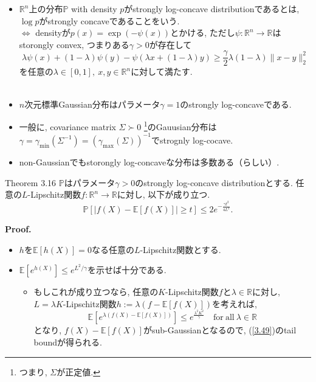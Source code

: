 \documentclass[aspectratio=169, dvipdfmx]{beamer}
\newcommand{\ex}{\mathbb{E}}
\begin{document}
\begin{frame}
\begin{itemize}
    \item $\mathbb{R}^n$上の分布$\mathbb{P}$ with density $p$が{strongly log-concave distribution}であるとは,
    $\log p$がstrongly concaveであることをいう.\\
    $\Leftrightarrow$ densityが$p(x) = \exp(-\psi(x))$とかける,
    ただし$\psi:\mathbb{R}^n\to\mathbb{R}$はstorongly convex, つまりある$\gamma > 0$が存在して
    \[
        \lambda \psi(x)+(1-\lambda) \psi(y)-\psi(\lambda x+(1-\lambda) y)
        \geq \frac{\gamma}{2} \lambda(1-\lambda)\|x-y\|_{2}^{2}
        \tag{3.48}\label{3.48}
    \]
    を任意の$\lambda \in[0,1],\ x,y\in\mathbb{R}^n$に対して満たす.\\
    　
    \item $n$次元標準Gaussian分布はパラメータ$\gamma=1$のstrongly log-concaveである.
    \item 一般に, covariance matrix $\Sigma\succ 0$
    \footnote{つまり, $\Sigma$が正定値.}のGauusian分布は$\gamma = \gamma_{\min}(\Sigma^{-1})=(\gamma_{\max}(\Sigma))^{-1}$でstrognly log-cocave.
    \item non-Gaussianでもstorongly log-concaveな分布は多数ある（らしい）.
\end{itemize}
\end{frame}

\begin{frame}
\begin{block}{Theorem 3.16}
    $\mathbb{P}$はパラメータ$\gamma>0$のstrongly log-concave distributionとする.
    任意の$L$-Lipschitz関数$f:\mathbb{R}^n\to\mathbb{R}$に対し, 以下が成り立つ.
    \[
        \mathbb{P}[|f(X)-\mathbb{E}[f(X)]|
        \geq t] \leq 2 e^{-\frac{\gamma t^{2}}{4 L^{2}}}.
        \tag{3.49}\label{3.49}
    \]
\end{block}
{\bf Proof.}
\begin{itemize}
    \item $h$を$\ex[h(X)]=0$なる任意の$L$-Lipschitz関数とする.
    \item $\ex[e^{h(X)}]\le e^{L^2/\gamma}$を示せば十分である.
    \begin{itemize}
        \item もしこれが成り立つなら, 任意の$K$-Lipschitz関数$f$と$\lambda\in\mathbb{R}$に対し,
        $L=\lambda K$-Lipschitz関数$h:= \lambda(f - \ex[f(X)])$を考えれば,
        \[ \ex[e^{\lambda(f(X)-\ex[f(X)])}] \le e^{\frac{\lambda^2 K^2}{\gamma}}\quad\mathrm{for\ all}\ \lambda\in\mathbb{R} \]
        となり, $f(X)-\ex[f(X)]$がsub-Gaussianとなるので, (\ref{3.49})のtail boundが得られる.
    \end{itemize}
\end{itemize}
\end{frame}
\end{document}
